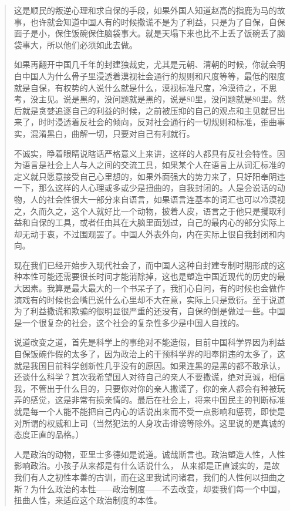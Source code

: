 \documentclass[12pt,oneside]{book}
\begin{document}
\begin{common-format}
\begin{quotation}
这是顺民的叛逆心理和求自保的手段，如果外国人知道赵高的指鹿为马的故事，也许就会知道中国人有的时候撒谎不是为了利益，只是为了自保，自保面子是小，保住饭碗保住脑袋事大。就是天塌下来也比不上丢了饭碗丢了脑袋事大，所以他们必须如此去做。

如果再翻开中国几千年的封建独裁史，尤其是元朝、清朝的时候，你就会明白中国人为什么骨子里浸透着漠视社会通行的规则和尺度等等，最低的限度就是自保，有权势的人说什么就是什么，漠视标准尺度，冷漠待之，不思考，没主见。说是黑的，没问题就是黑的，说是80里，没问题就是80里。然后就是贪婪追逐自己的利益的时候，之前被压抑的自己的观点和主见就冒出来了，时时浸透着反社会的倾向，反对社会通行的一切规则和标准，歪曲事实，混淆黑白，曲解一切，只要对自己有利就行。

不诚实，睁着眼睛说瞎话严格意义上来讲，这样的人都具有反社会特性。因为语言是社会上人与人之间的交流工具，如果某个人在语言上从词汇标准的定义就只愿意接受自己心里想的，如果外面强大的势力来了，只好阳奉阴违一下，那么这样的人心理或多或少是扭曲的，自我封闭的。人是会说话的动物，人的社会性很大一部分来自语言，如果语言连基本的词汇也可以冷漠视之，久而久之，这个人就好比一个动物，披着人皮，语言之于他只是攫取利益和自保的工具，或者任由其在大脑里面划过，自己的最内心的部分实际上却无动于衷，不过围观罢了。中国人外表外向，内在实际上很自我封闭和内向。

现在我们已经开始步入现代社会了，而中国人这种自封建专制时期形成的这种本性可能还需要很长时间才能消除掉，这也是塑造中国近现代的历史的最大因素。我算是最大最大的一个书呆子了，我扪心自问，有的时候也会做作演戏有的时候也会嘴巴说什么心里却不大在意，实际上只是敷衍。至于说道为了利益撒谎和欺骗的很明显很严重的还没有，自保的倒是做过一些。中国是一个很复杂的社会，这个社会的复杂性多少是中国人自找的。

说道改变之道，首先是科学上的事绝对不能造假，目前中国科学界因为利益自保饭碗作假的太多了，因为政治上的干预科学界的阳奉阴违的太多了，这就是我国目前科学创新性几乎没有的原因。如果连黑的是黑的都不敢承认，还谈什么科学？其次我希望国人对待自己的亲人不要撒谎，绝对真诚，相信我，不管出于什么目的，只要你对你的亲人撒谎了，你的亲人都会有种被玩弄的感觉，这是非常有损亲情的。最后在社会上，将来中国民主的判断标准就是每一个人能不能把自己内心的话说出来而不受一点影响和惩罚，即使是对所谓的权威和上司（当然犯法的人身攻击诽谤等除外。这里说的是真诚的态度正直的品格。）

人是政治的动物，亚里士多德如是说道。诚哉斯言也。政治塑造人性，人性影响政治。小孩子从来都是有什么话说什么， 从来都是正直诚实的，是故我们有人之初性本善的古训，而在这里我试问诸君，我们的人性何以扭曲之斯？为什么政治的本性——政治制度——不去改变，却要我们每一个中国，扭曲人性，来适应这个政治制度的本性。


\end{quotation}
\end{common-format}
\end{document}
